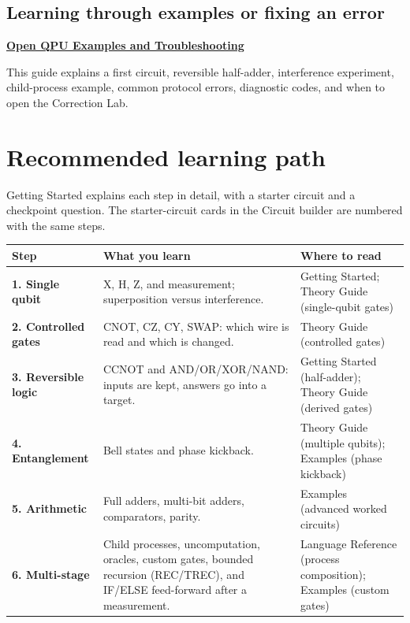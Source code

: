 \subsection{Learning through examples or fixing an error}

\textbf{\href{QPU_Examples_and_Troubleshooting.pdf}{Open QPU Examples and Troubleshooting}}

This guide explains a first circuit, reversible half-adder, interference
experiment, child-process example, common protocol errors, diagnostic codes,
and when to open the Correction Lab.

\section{Recommended learning path}

Getting Started explains each step in detail, with a starter circuit and a
checkpoint question. The starter-circuit cards in the Circuit builder are
numbered with the same steps.

\begin{center}
\begin{tabularx}{\textwidth}{>{\bfseries}p{}X>{\raggedright\arraybackslash}p{}}
\toprule
Step & What you learn & Where to read\\
\midrule
1. Single qubit & X, H, Z, and measurement; superposition versus
interference. & Getting Started; Theory Guide (single-qubit gates)\\
2. Controlled gates & CNOT, CZ, CY, SWAP: which wire is read and which is
changed. & Theory Guide (controlled gates)\\
3. Reversible logic & CCNOT and AND/OR/XOR/NAND: inputs are kept, answers go
into a target. & Getting Started (half-adder); Theory Guide (derived gates)\\
4. Entanglement & Bell states and phase kickback. & Theory Guide (multiple
qubits); Examples (phase kickback)\\
5. Arithmetic & Full adders, multi-bit adders, comparators, parity. &
Examples (advanced worked circuits)\\
6. Multi-stage & Child processes, uncomputation, oracles, custom gates,
bounded recursion (REC/TREC), and IF/ELSE feed-forward after a measurement. &
Language Reference (process composition); Examples (custom gates)\\
\bottomrule
\end{tabularx}
\end{center}

